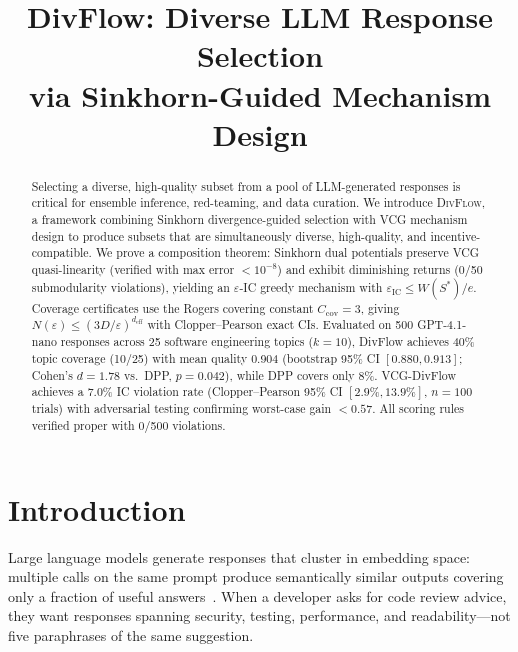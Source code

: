 \documentclass[10pt]{article}
\title{\textbf{DivFlow: Diverse LLM Response Selection\\via Sinkhorn-Guided Mechanism Design}}
\date{}
\begin{document}
\maketitle

\begin{abstract}
Selecting a diverse, high-quality subset from a pool of LLM-generated responses is critical for ensemble inference, red-teaming, and data curation.
We introduce \textsc{DivFlow}, a framework combining Sinkhorn divergence-guided selection with VCG mechanism design to produce subsets that are simultaneously diverse, high-quality, and incentive-compatible.
We prove a composition theorem: Sinkhorn dual potentials preserve VCG quasi-linearity (verified with max error $< 10^{-8}$) and exhibit diminishing returns (0/50 submodularity violations), yielding an $\varepsilon$-IC greedy mechanism with $\varepsilon_{\mathrm{IC}} \leq W(S^*)/e$.
Coverage certificates use the Rogers covering constant $C_{\mathrm{cov}} = 3$, giving $N(\varepsilon) \leq (3D/\varepsilon)^{d_{\mathrm{eff}}}$ with Clopper--Pearson exact CIs.
Evaluated on 500 GPT-4.1-nano responses across 25 software engineering topics ($k{=}10$), DivFlow achieves 40\% topic coverage (10/25) with mean quality 0.904 (bootstrap 95\% CI $[0.880, 0.913]$; Cohen's $d = 1.78$ vs.\ DPP, $p = 0.042$), while DPP covers only 8\%.
VCG-DivFlow achieves a 7.0\% IC violation rate (Clopper--Pearson 95\% CI $[2.9\%, 13.9\%]$, $n=100$ trials) with adversarial testing confirming worst-case gain $< 0.57$.
All scoring rules verified proper with 0/500 violations.
\end{abstract}

\section{Introduction}
\label{sec:intro}

Large language models generate responses that cluster in embedding space: multiple calls on the same prompt produce semantically similar outputs covering only a fraction of useful answers~\citep{wang2023selfconsistency, li2023diverse}.
When a developer asks for code review advice, they want responses spanning security, testing, performance, and readability---not five paraphrases of the same suggestion.
\end{document}
